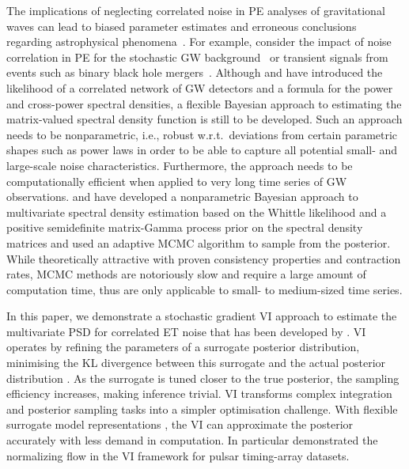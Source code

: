 \documentclass[%
 reprint,
 amsmath,amssymb,
 aps,
]{revtex4-2}
\begin{document}
The implications of neglecting correlated noise in \ac{PE} analyses of gravitational waves can lead to biased parameter estimates and erroneous conclusions regarding astrophysical phenomena~\cite{Thrane_correlations_SGWB, Christensen_2019_SGWB, Cireddu:2023:arXiv, boileau2022figures}. For example, consider the impact of noise correlation in \ac{PE} for the stochastic \ac{GW} background~\cite{boileau2022figures} or transient signals from events such as binary black hole mergers~\cite{Cireddu:2023:arXiv}. Although \citet{Cireddu:2023:arXiv} and \citet{JanssensKamiel2023Ffps} have introduced the likelihood of a correlated network of GW detectors and a formula for the power and cross-power spectral densities, a flexible Bayesian approach to estimating the matrix-valued spectral density function is still to be developed. Such an approach needs to be nonparametric, i.e., robust w.r.t.\ deviations from certain parametric shapes such as power laws in order to be able to capture all potential small- and large-scale noise characteristics.
Furthermore, the approach needs to be computationally efficient when applied to very long time series of GW observations. \citet{MeierAlexander2020Bnao} and \citet{LiuYixuan2024Ancl} have developed a nonparametric Bayesian approach to multivariate spectral density estimation based on the Whittle likelihood and a positive semidefinite matrix-Gamma process prior on the spectral density matrices and used an adaptive MCMC algorithm to sample from the posterior. While theoretically attractive with proven consistency properties and contraction rates, MCMC methods are notoriously slow and require a large amount of computation time, thus are only applicable to small- to medium-sized time series. 




In this paper, we demonstrate a stochastic gradient \ac{VI} approach to estimate the multivariate \ac{PSD} for correlated \ac{ET} noise that has been developed by \cite{Hu2023}. 
\ac{VI} operates by refining the parameters of a surrogate posterior distribution, minimising the \ac{KL} divergence between this surrogate and the actual posterior distribution \cite{Jordan1999,Wainwright2008,Blei2017}. As the surrogate is tuned closer to the true posterior, the sampling efficiency increases, making inference trivial. 
VI transforms complex integration and posterior sampling tasks into a simpler optimisation challenge. With flexible surrogate model representations \cite{Blei2006,kingma2022}, the VI can approximate the posterior accurately with less demand in computation. In particular \citet{Vallisneri2024} demonstrated the normalizing flow in the VI framework for pulsar timing-array datasets. 
\end{document}
